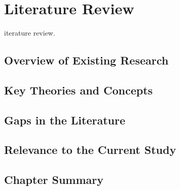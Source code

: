 \chapter{Literature Review}\label{ch02}

iterature review.


\section{Overview of Existing Research}

\section{Key Theories and Concepts}

\section{Gaps in the Literature}

\section{Relevance to the Current Study}

\section{Chapter Summary}
